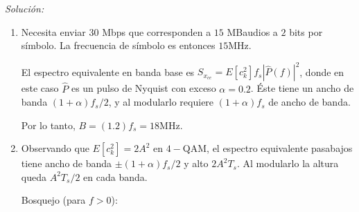 \documentclass[a4paper,11pt]{article}
\newenvironment{solucion}[1][]{
\noindent \large \textsl{Solución:} \ifthenelse{\equal{#1}{}}{}{\emph{(#1)}}

\smallskip
}{
\bigskip
}
\begin{document}
\begin{solucion}

        \begin{enumerate}
                \item Necesita enviar $30$ Mbps que corresponden a $15$ MBaudios a $2$ bits por símbolo. La frecuencia de símbolo es entonces $15\unit{\mega\hertz}$.
                
                El espectro equivalente en banda base es $S_{x_{ce}} = E[c_k^2]f_s |\hat{P}(f)|^2$, donde en este caso $\hat{P}$ es un pulso de Nyquist con exceso $\alpha=0.2$. Éste tiene un ancho de banda $(1+\alpha)f_s/2$, y al modularlo requiere $(1+\alpha)f_s$ de ancho de banda.

                Por lo tanto, $B=(1.2)f_s = 18 \unit{\mega\hertz}$.

                \item Observando que $E[c_k^2] = 2 A^2$ en $4-$QAM, el espectro equivalente pasabajos tiene ancho de banda $\pm (1+\alpha)f_s/2$ y alto $2A^2 T_s$. Al modularlo la altura queda $A^2 T_s/2$ en cada banda.
                
                Bosquejo (para $f>0$):
                \begin{center}
                \end{center}


\end{enumerate}
\end{solucion}
\end{document}
